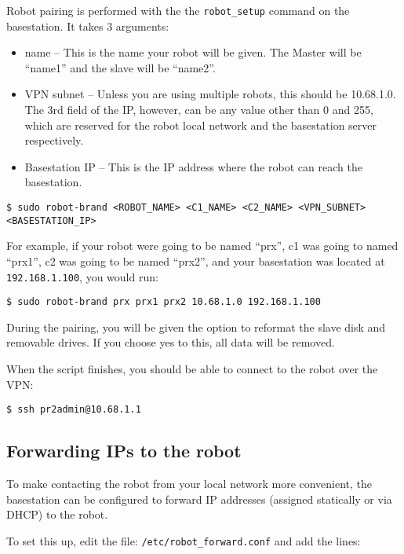 Robot pairing is performed with the the \texttt{robot\_setup} command
on the basestation.  It takes 3 arguments:

\begin{itemize}
\item name -- This is the name your robot will be given.  The Master will be ``name1'' and the slave will be ``name2''.
\item VPN subnet -- Unless you are using multiple robots, this should be 10.68.1.0.  The 3rd field of the IP, however, can be any value other than 0 and 255, which are reserved for the robot local network and the basestation server respectively.
\item Basestation IP -- This is the IP address where the robot can reach the basestation.
\end{itemize}


\begin{verbatim}
$ sudo robot-brand <ROBOT_NAME> <C1_NAME> <C2_NAME> <VPN_SUBNET> <BASESTATION_IP>
\end{verbatim}

For example, if your robot were going to be named ``prx'', c1 was going to named ``prx1'', c2 was going to be named ``prx2'', and your basestation was located at \texttt{192.168.1.100}, you would run:

\begin{verbatim}
$ sudo robot-brand prx prx1 prx2 10.68.1.0 192.168.1.100
\end{verbatim}

During the pairing, you will be given the option to reformat the slave
disk and removable drives.  If you choose yes to this, all data will
be removed.

When the script finishes, you should be able to connect to the robot over the VPN:

\begin{verbatim}
$ ssh pr2admin@10.68.1.1
\end{verbatim}

\subsection{Forwarding IPs to the robot}

To make contacting the robot from your local network more convenient,
the basestation can be configured to forward IP addresses (assigned
statically or via DHCP) to the robot.

To set this up, edit the file: \texttt{/etc/robot\_forward.conf} and add the lines:

